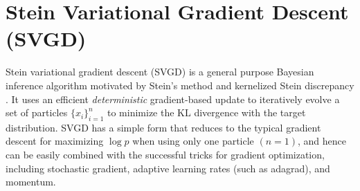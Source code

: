\documentclass{article} %
\begin{document}
\section{Stein Variational Gradient Descent (SVGD)}
Stein variational gradient descent (SVGD) \citep{liu2016stein} is a general purpose Bayesian inference algorithm motivated by 
Stein's method \citep{stein1972, barbour2005introduction} and kernelized Stein discrepancy \citep{liu2016kernelized, chwialkowski2016kernel, oates2014control}. 
It uses an efficient \emph{deterministic} gradient-based update 
to iteratively evolve a set of particles $\{x_i\}_{i=1}^n$ to minimize the KL divergence with the target distribution. 
SVGD has a simple form that reduces to the typical gradient descent for maximizing $\log p$ when using only one particle $(n=1)$, 
and hence can be easily combined with the successful tricks for gradient optimization, 
including stochastic gradient, adaptive learning rates (such as adagrad), and momentum. %
\end{document}
